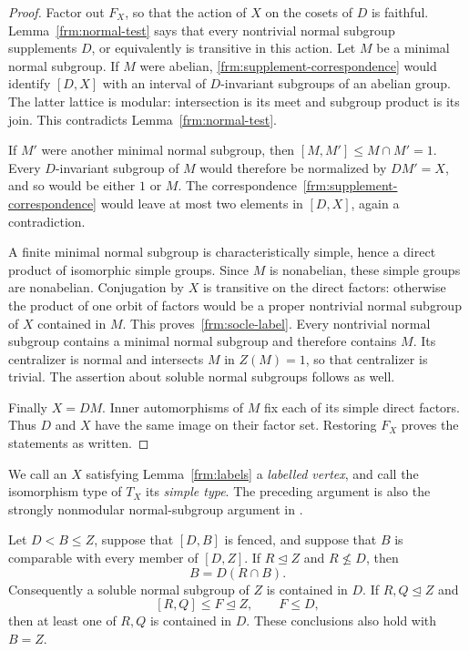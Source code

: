 \begin{proof}
Factor out $F_X$, so that the action of $X$ on the cosets of $D$ is
faithful. Lemma~\ref{frm:normal-test} says that every nontrivial normal
subgroup supplements $D$, or equivalently is transitive in this action.
Let $M$ be a minimal normal subgroup. If $M$ were abelian,
\eqref{frm:supplement-correspondence} would identify $[D,X]$ with an
interval of $D$-invariant subgroups of an abelian group. The latter lattice
is modular: intersection is its meet and subgroup product is its join.
This contradicts Lemma~\ref{frm:normal-test}.

If $M'$ were another minimal normal subgroup, then
$[M,M']\le M\cap M'=1$. Every $D$-invariant subgroup of $M$ would
therefore be normalized by $DM'=X$, and so would be either $1$ or $M$.
The correspondence~\eqref{frm:supplement-correspondence} would leave
at most two elements in $[D,X]$, again a contradiction.

A finite minimal normal subgroup is characteristically simple, hence
a direct product of isomorphic simple groups. Since $M$ is nonabelian,
these simple groups are nonabelian. Conjugation by $X$ is transitive on
the direct factors: otherwise the product of one orbit of factors would
be a proper nontrivial normal subgroup of $X$ contained in $M$. This
proves~\eqref{frm:socle-label}. Every nontrivial normal subgroup contains
a minimal normal subgroup and therefore contains $M$. Its centralizer
is normal and intersects $M$ in $Z(M)=1$, so that centralizer is trivial.
The assertion about soluble normal subgroups follows as well.

Finally $X=DM$. Inner automorphisms of $M$ fix each of its simple direct
factors. Thus $D$ and $X$ have the same image on their factor set.
Restoring $F_X$ proves the statements as written.
\end{proof}

We call an $X$ satisfying Lemma~\ref{frm:labels} a \emph{labelled
vertex}, and call the isomorphism type of $T_X$ its \emph{simple type}.
The preceding argument is also the strongly nonmodular normal-subgroup
argument in \cite[Lemma~3.6]{PalfyTwisted}.

\begin{corollary}[Bottlenecks]
\label{frm:bottleneck}
Let $D<B\le Z$, suppose that $[D,B]$ is fenced, and suppose that $B$
is comparable with every member of $[D,Z]$. If $R\trianglelefteq Z$
and $R\nleq D$, then
\[
 B=D(R\cap B).
\]
Consequently a soluble normal subgroup of $Z$ is contained in $D$.
If $R,Q\trianglelefteq Z$ and
\[
 [R,Q]\le F\trianglelefteq Z,\qquad F\le D,
\]
then at least one of $R,Q$ is contained in $D$.
These conclusions also hold with $B=Z$.
\end{corollary}


